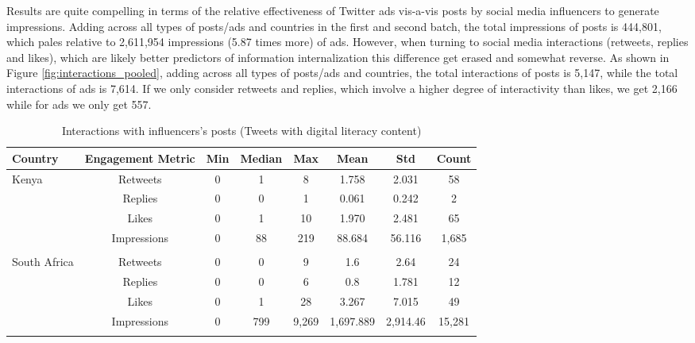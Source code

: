 Results are quite compelling in terms of the relative effectiveness of Twitter ads vis-a-vis posts by social media influencers to generate impressions. Adding across all types of posts/ads and countries in the first and second batch, the total impressions of posts is 444,801, which pales relative to 2,611,954 impressions (5.87 times more) of ads. However, when turning to social media interactions (retweets, replies and likes), which are likely better predictors of information internalization this difference get erased and somewhat reverse. 
As shown in Figure \ref{fig:interactions_pooled}, adding across all types of posts/ads and countries, the total interactions of posts is 5,147, while the total interactions of ads is 7,614. If we only consider retweets and replies, which involve a higher degree of interactivity than likes, we get 2,166 while for ads we only get 557.


\begin{table}[h!]
\centering
\caption{Interactions with influencers's posts (Tweets with digital literacy content)}
\label{tab:smi_dl}
\begin{tabular}{lccccccc}
  \hline
 \bfseries{Country} & \bfseries{Engagement Metric} & \bfseries{Min} & \bfseries{Median} & \bfseries{Max} & \bfseries{Mean} & \bfseries{Std} & \bfseries{Count} \\ 
  \hline
  Kenya & Retweets & 0 & 1 & 8 & 1.758 & 2.031 & 58\\
 & Replies & 0 & 0 & 1 & 0.061 & 0.242 & 2\\ 
 & Likes &  0 & 1 & 10 & 1.970 & 2.481 & 65\\ 
 & Impressions &  0 & 88 & 219 & 88.684 & 56.116 & 1,685
 \\\hline \\[-1.8ex] 
 South Africa & Retweets & 0 & 0 & 9 & 1.6 & 2.64 & 24 \\ 
 & Replies & 0 & 0 & 6 & 0.8 & 1.781 & 12\\ 
 & Likes &  0 & 1 & 28 & 3.267 & 7.015 & 49\\ 
 & Impressions & 0 & 799 & 9,269 & 1,697.889 & 2,914.46 & 15,281\\
   \hline\\

\end{tabular}
\end{table}

